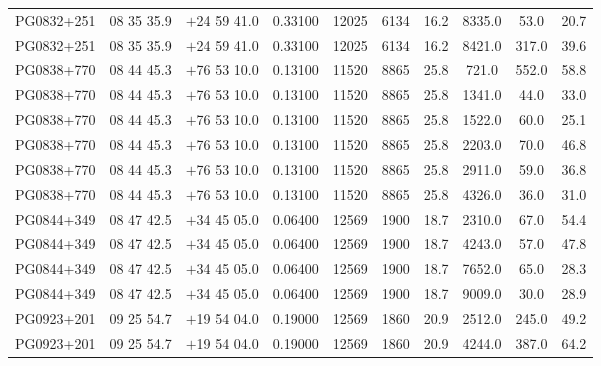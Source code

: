 \begin{landscape}
\begin{center}
\begin{longtable}{l c c c c c c c c c}
PG0832+251  &              08 35 35.9  &         $+$24 59 41.0  &       0.33100  & 12025  &   6134  &       16.2  &      8335.0  &  53.0  &   20.7  \\
PG0832+251  &              08 35 35.9  &         $+$24 59 41.0  &       0.33100  & 12025  &   6134  &       16.2  &      8421.0  &  317.0  &  39.6  \\
PG0838+770  &              08 44 45.3  &         $+$76 53 10.0  &       0.13100  & 11520  &   8865  &       25.8  &      721.0  &   552.0  &  58.8  \\
PG0838+770  &              08 44 45.3  &         $+$76 53 10.0  &       0.13100  & 11520  &   8865  &       25.8  &      1341.0  &  44.0  &   33.0  \\
PG0838+770  &              08 44 45.3  &         $+$76 53 10.0  &       0.13100  & 11520  &   8865  &       25.8  &      1522.0  &  60.0  &   25.1  \\
PG0838+770  &              08 44 45.3  &         $+$76 53 10.0  &       0.13100  & 11520  &   8865  &       25.8  &      2203.0  &  70.0  &   46.8  \\
PG0838+770  &              08 44 45.3  &         $+$76 53 10.0  &       0.13100  & 11520  &   8865  &       25.8  &      2911.0  &  59.0  &   36.8  \\
PG0838+770  &              08 44 45.3  &         $+$76 53 10.0  &       0.13100  & 11520  &   8865  &       25.8  &      4326.0  &  36.0  &   31.0  \\
PG0844+349  &              08 47 42.5  &         $+$34 45 05.0  &       0.06400  & 12569  &   1900  &       18.7  &      2310.0  &  67.0  &   54.4  \\
PG0844+349  &              08 47 42.5  &         $+$34 45 05.0  &       0.06400  & 12569  &   1900  &       18.7  &      4243.0  &  57.0  &   47.8  \\
PG0844+349  &              08 47 42.5  &         $+$34 45 05.0  &       0.06400  & 12569  &   1900  &       18.7  &      7652.0  &  65.0  &   28.3  \\
PG0844+349  &              08 47 42.5  &         $+$34 45 05.0  &       0.06400  & 12569  &   1900  &       18.7  &      9009.0  &  30.0  &   28.9  \\
PG0923+201  &              09 25 54.7  &         $+$19 54 04.0  &       0.19000  & 12569  &   1860  &       20.9  &      2512.0  &  245.0  &  49.2  \\
PG0923+201  &              09 25 54.7  &         $+$19 54 04.0  &       0.19000  & 12569  &   1860  &       20.9  &      4244.0  &  387.0  &  64.2  \\

\end{longtable}
\end{center}
\end{landscape}

